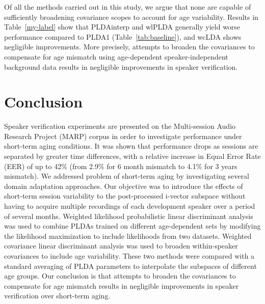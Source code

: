 \documentclass[a4paper]{article}
\begin{document}
Of all the methods carried out in this study, we argue that none are capable of sufficiently broadening covariance scopes to account for age variability. Results in Table~\ref{my-label} show that PLDAinterp and wlPLDA generally yield worse performance compared to PLDA1 (Table~\ref{tab:baseline}), and wcLDA shows negligible improvements. More precisely, attempts to broaden the covariances to compensate for age mismatch using age-dependent speaker-independent background data results in negligible improvements in speaker verification. 

\section{Conclusion}
Speaker verification experiments are presented on the Multi-session Audio Research Project (MARP) corpus in order to investigate performance under short-term aging conditions. It was shown that performance drops as sessions are separated by greater time differences, with a relative increase in Equal Error Rate (EER) of up to 42\% (from 2.9\% for 6 month mismatch to 4.1\% for 3 years mismatch). We addressed problem of short-term aging by investigating several domain adaptation approaches. Our objective was to introduce the effects of short-term session variability to the post-processed i-vector subspace without having to acquire multiple recordings of each development speaker over a period of several months. Weighted likelihood probabilistic linear discriminant analysis was used to combine PLDAs trained on different age-dependent sets by modifying the likelihood maximization to include likelihoods from two datasets. Weighted covariance linear discriminant analysis was used to broaden within-speaker covariances to include age variability. These two methods were compared with a standard averaging of PLDA parameters to interpolate the subspaces of different age groups. Our conclusion is that attempts to broaden the covariances to compensate for age mismatch results in negligible improvements in speaker verification over short-term aging. 

  \newpage
  

  
\end{document}
